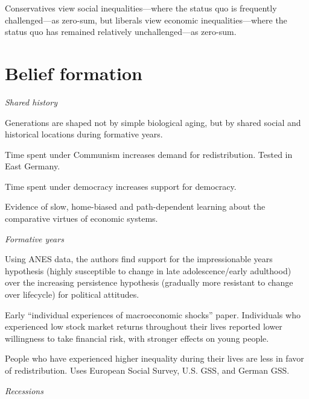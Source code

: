 \documentclass{article}
\newcommand{\citem}[1]{\medskip \noindent \textbf{\cite*{#1}}}
\newcommand{\texth}[1]{\noindent \textit{#1}}
\newcommand{\textm}[1]{\medskip \noindent \textit{#1}}
\begin{document}
Conservatives view social inequalities---where the status quo is frequently challenged---as zero-sum, but liberals view economic inequalities---where the status quo has remained relatively unchallenged---as zero-sum.




\section*{Belief formation}

\texth{Shared history}

\citem{mannheim1952sociological}

Generations are shaped not by simple biological aging, but by shared social and historical locations during formative years.

\citem{alesina2007good}

Time spent under Communism increases demand for redistribution. Tested in East Germany.

\citem{fuchs2015endogeneity}

Time spent under democracy increases support for democracy.

\citem{landier2008investigating}

Evidence of slow, home-biased and path-dependent learning about the comparative virtues of economic systems.

\textm{Formative years}

\citem{krosnick1989aging}

Using ANES data, the authors find support for the impressionable years hypothesis (highly susceptible to change in late adolescence/early adulthood) over the increasing persistence hypothesis (gradually more resistant to change over lifecycle) for political attitudes.

\citem{malmendier2011depression}

Early ``individual experiences of macroeconomic shocks'' paper. Individuals who experienced low stock market returns throughout their lives reported lower willingness to take financial risk, with stronger effects on young people.

\citem{roth2018experienced}

People who have experienced higher inequality during their lives are less in favor of redistribution. Uses European Social Survey, U.S. GSS, and German GSS.

\textm{Recessions}

\citem{carreri2023economic}
\end{document}
